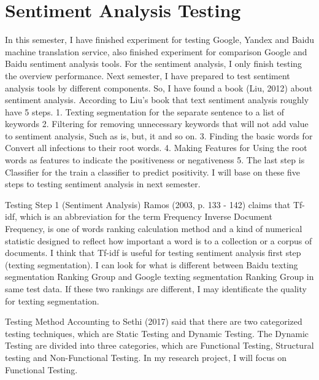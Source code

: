 \documentclass[conference]{IEEEtran}
\begin{document}
\section{Sentiment Analysis Testing}
 In this semester, I have finished experiment for testing Google, Yandex and Baidu machine translation service, also finished experiment for comparison Google and Baidu sentiment analysis tools. For the sentiment analysis, I only finish testing the overview performance. Next semester, I have prepared to test sentiment analysis tools by different components. So, I have found a book (Liu, 2012) about sentiment analysis. According to Liu’s book that text sentiment analysis roughly have 5 steps.
1. Texting segmentation for the separate sentence to a list of keywords
2. Filtering for removing unnecessary keywords that will not add value to sentiment analysis,
Such as is, but, it and so on.
3. Finding the basic words for Convert all infections to their root words.
4. Making Features for Using the root words as features to indicate the positiveness or negativeness
5. The last step is Classifier for the train a classifier to predict positivity.
I will base on these five steps to testing sentiment analysis in next semester.




Testing Step 1 (Sentiment Analysis)
Ramos (2003, p. 133 - 142) claims that Tf-idf, which is an abbreviation for the term Frequency Inverse Document Frequency, is one of words ranking calculation method and a kind of numerical statistic designed to reflect how important a word is to a collection or a corpus of documents.
I think that Tf-idf is useful for testing sentiment analysis first step (texting segmentation). I can look for what is different between Baidu texting segmentation Ranking Group and Google texting segmentation Ranking Group in same test data. If these two rankings are different, I may identificate the quality for texting segmentation.
















Testing Method
Accounting to Sethi (2017) said that there are two categorized testing techniques, which are Static Testing and Dynamic Testing. The Dynamic Testing are divided into three categories, which are Functional Testing, Structural testing and Non-Functional Testing. In my research project, I will focus on Functional Testing.
\end{document}
